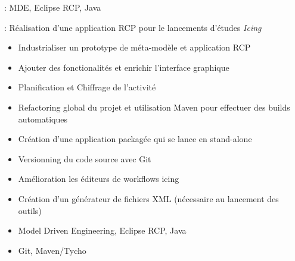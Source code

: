 

 : MDE, Eclipse RCP, Java

 : Réalisation d'une application RCP pour le lancements d'études {\it Icing}

\bigskip


\begin{itemize}
\item Industrialiser un prototype de méta-modèle et application RCP
\item Ajouter des fonctionalités et enrichir l'interface graphique
\end{itemize} 


\begin{itemize}
\item Planification et Chiffrage de l'activité
\item Refactoring global du projet et utilisation Maven pour effectuer des builds automatiques
\item Création d'une application packagée qui se lance en stand-alone
\item Versionning du code source avec Git
\item Amélioration les éditeurs de workflows icing
\item Création d'un générateur de fichiers XML (nécessaire au lancement des outils)
\end{itemize} 


\begin{itemize}
\item Model Driven Engineering, Eclipse RCP, Java
\item Git, Maven/Tycho
\end{itemize}